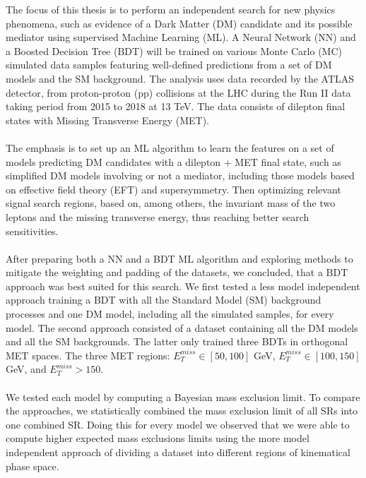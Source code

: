\documentclass[12pt, a4paper]{book}
\begin{document}
The focus of this thesis is to perform an independent search for new physics phenomena, such as evidence of a Dark Matter (DM) candidate and its possible mediator using supervised Machine Learning (ML). A Neural Network (NN) and a Boosted Decision Tree (BDT) will 
be trained on various Monte Carlo (MC) simulated data samples featuring well-defined predictions from a set of DM models and the SM background. The analysis uses data recorded by the ATLAS detector, from proton-proton (pp) collisions at the LHC during the Run II data taking period from 2015 to 2018 at 13 TeV. 
The data consists of dilepton final states with Missing Transverse Energy (MET).\\
\\The emphasis is to set up an ML algorithm to learn the features on a set of models predicting DM candidates with a dilepton + MET final state, such as simplified DM models 
involving or not a mediator, including those models based on effective field theory (EFT) and supersymmetry. Then optimizing relevant signal search regions, based on, among others, the invariant mass of the two leptons and the missing transverse energy, 
thus reaching better search sensitivities.\\
\\After preparing both a NN and a BDT ML algorithm and exploring methods to mitigate the weighting and padding of the datasets, we concluded, that a BDT approach was best suited for this search. We first tested a less model independent approach training a BDT with all the Standard Model (SM) background processes and one DM model, 
including all the simulated samples, for every model. The second approach consisted of a dataset containing all the DM models and all the SM backgrounds. The latter only trained three BDTs in orthogonal MET spaces. The three MET regions: $E_T^{miss}\in[50,100]$ GeV,
$E_T^{miss}\in[100,150]$ GeV, and $E_T^{miss}>150$.\\
\\We tested each model by computing a Bayesian mass exclusion limit. To compare the approaches, we statistically combined the mass exclusion limit of all SRs into one combined SR. Doing this for every model we observed that we were able 
to compute higher expected mass exclusions limits using the more model independent approach of dividing a dataset into different regions of kinematical phase space. 
\end{document}
